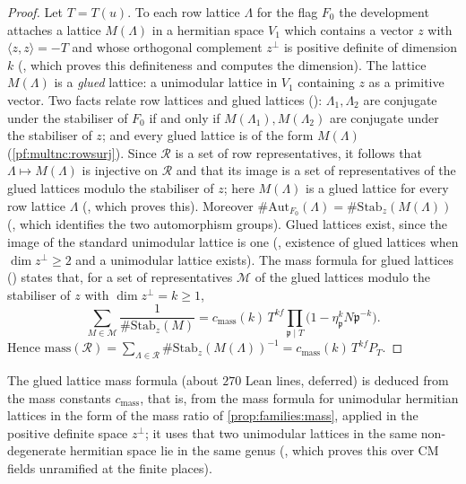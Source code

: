\begin{proof}
Let $T=T(u)$. To each row lattice $\Lambda$ for the flag $F_0$ the development attaches a lattice $M(\Lambda)$ in a hermitian
space $V_1$ which contains a vector $z$ with $\langle z,z\rangle=-T$ and whose orthogonal complement $z^\perp$ is positive
definite of dimension $k$ (,
which proves this definiteness and computes the dimension). The lattice $M(\Lambda)$ is a \emph{glued} lattice: a unimodular
lattice in $V_1$ containing $z$ as a primitive vector. Two facts relate row lattices and glued lattices
(): $\Lambda_1,\Lambda_2$ are conjugate under the
stabiliser of $F_0$ if and only if $M(\Lambda_1),M(\Lambda_2)$ are conjugate under the stabiliser of $z$; and every glued
lattice is of the form $M(\Lambda)$ (\cref{pf:multnc:rowsurj}). Since
$\mathcal R$ is a set of row representatives, it follows that $\Lambda\mapsto M(\Lambda)$ is injective on $\mathcal R$ and
that its image is a set of representatives of the glued lattices modulo the stabiliser of $z$; here $M(\Lambda)$ is a glued
lattice for every row lattice $\Lambda$ (,
which proves this). Moreover $\#\mathrm{Aut}_{F_0}(\Lambda)=\#\mathrm{Stab}_z(M(\Lambda))$
(, which identifies the two automorphism
groups). Glued lattices exist, since the image of the standard unimodular lattice is one
(, existence of glued lattices
when $\dim z^\perp\ge2$ and a unimodular lattice exists). The mass formula for glued lattices
() states that, for a set
of representatives $\mathcal M$ of the glued lattices modulo the stabiliser of $z$ with $\dim z^\perp=k\ge1$,
\[
\sum_{M\in\mathcal M}\frac1{\#\mathrm{Stab}_z(M)}=c_{\mathrm{mass}}(k)\,T^{kf}\prod_{\mathfrak p\mid T}
\bigl(1-\eta_{\mathfrak p}^kN\mathfrak p^{-k}\bigr).
\]
Hence $\mathrm{mass}(\mathcal R)=\sum_{\Lambda\in\mathcal R}\#\mathrm{Stab}_z(M(\Lambda))^{-1}=c_{\mathrm{mass}}(k)\,T^{kf}P_T$.
\end{proof}

The glued lattice mass formula (about $270$ Lean lines, deferred) is deduced from the mass constants $c_{\mathrm{mass}}$, that
is, from the mass formula for unimodular hermitian lattices in the form of the mass ratio of \cref{prop:families:mass},
applied in the positive definite space $z^\perp$; it uses that two unimodular lattices in the same non-degenerate hermitian space lie in the same
genus (, which proves this over CM fields unramified
at the finite places).


